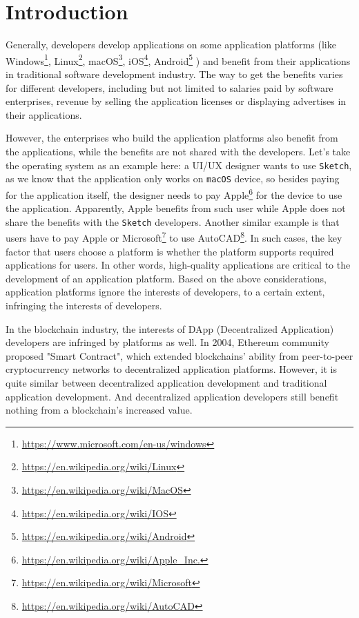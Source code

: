 \section{Introduction}

Generally, developers develop applications on some application platforms (like
Windows\footnote{\url{https://www.microsoft.com/en-us/windows}}, Linux\footnote{\url{https://en.wikipedia.org/wiki/Linux}},
macOS\footnote{\url{https://en.wikipedia.org/wiki/MacOS}},
iOS\footnote{\url{https://en.wikipedia.org/wiki/IOS}},
Android\footnote{\url{https://en.wikipedia.org/wiki/Android}} \etc) and
benefit from their applications in traditional software development industry.
The way to get the benefits varies for different developers, including but not
limited to salaries paid by software enterprises, revenue by selling the
application licenses or displaying advertises in their applications.

However, the enterprises who build the application platforms also benefit
from the applications, while the benefits are not shared with the developers.
Let's take the operating system as an example here: a UI/UX designer wants to use \texttt{Sketch},
as we know that the application only works on \texttt{macOS} device, so besides
paying for the application itself, the designer needs to pay Apple\footnote{\url{https://en.wikipedia.org/wiki/Apple_Inc.}}
for the device  to use the application. Apparently, Apple benefits from such user while
Apple does not share the benefits with the \texttt{Sketch} developers.
Another similar example is that users have to pay Apple or
Microsoft\footnote{\url{https://en.wikipedia.org/wiki/Microsoft}} to use
AutoCAD\footnote{\url{https://en.wikipedia.org/wiki/AutoCAD}}. In such cases,
the key factor that users choose a platform is whether the platform
supports required applications for users. In other words, high-quality
applications are critical to the development of an application platform. Based on the above considerations,  application platforms ignore the interests of developers, to a certain extent, infringing the interests of developers.

In the blockchain industry, the interests of
DApp (Decentralized Application) developers are infringed by platforms  as  well.
 In 2004, Ethereum community proposed "Smart Contract",
which extended blockchains' ability from peer-to-peer
cryptocurrency networks to decentralized application platforms. However, it is
quite similar between decentralized application development and traditional
application development. And decentralized application developers still benefit
nothing from a blockchain's increased value.


